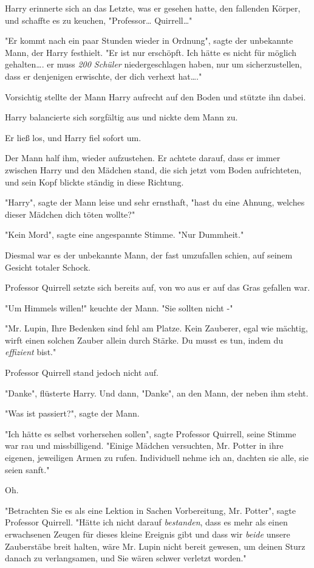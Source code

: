 {Harry erinnerte sich an das Letzte, was er gesehen hatte, den fallenden Körper, und schaffte es zu keuchen, "Professor… Quirrell…"

"Er kommt nach ein paar Stunden wieder in Ordnung", sagte der unbekannte Mann, der Harry festhielt. "Er ist nur erschöpft. Ich hätte es nicht für möglich gehalten…. er muss \emph{200 Schüler} niedergeschlagen haben, nur um sicherzustellen, dass er denjenigen erwischte, der dich verhext hat…."

Vorsichtig stellte der Mann Harry aufrecht auf den Boden und stützte ihn dabei.

Harry balancierte sich sorgfältig aus und nickte dem Mann zu.

Er ließ los, und Harry fiel sofort um.

Der Mann half ihm, wieder aufzustehen. Er achtete darauf, dass er immer zwischen Harry und den Mädchen stand, die sich jetzt vom Boden aufrichteten, und sein Kopf blickte ständig in diese Richtung.

"Harry", sagte der Mann leise und sehr ernsthaft, "hast du eine Ahnung, welches dieser Mädchen dich töten wollte?"

"Kein Mord", sagte eine angespannte Stimme. "Nur Dummheit."

Diesmal war es der unbekannte Mann, der fast umzufallen schien, auf seinem Gesicht totaler Schock.

Professor Quirrell setzte sich bereits auf, von wo aus er auf das Gras gefallen war.

"Um Himmels willen!" keuchte der Mann. "Sie sollten nicht -"

"Mr. Lupin, Ihre Bedenken sind fehl am Platze. Kein Zauberer, egal wie mächtig, wirft einen solchen Zauber allein durch Stärke. Du musst es tun, indem du \emph{effizient} bist."

Professor Quirrell stand jedoch nicht auf.

"Danke", flüsterte Harry. Und dann, "Danke", an den Mann, der neben ihm steht.

"Was ist passiert?", sagte der Mann.

"Ich hätte es selbst vorhersehen sollen", sagte Professor Quirrell, seine Stimme war rau und missbilligend. "Einige Mädchen versuchten, Mr. Potter in ihre eigenen, jeweiligen Armen zu rufen. Individuell nehme ich an, dachten sie alle, sie seien sanft."

Oh.

"Betrachten Sie es als eine Lektion in Sachen Vorbereitung, Mr. Potter", sagte Professor Quirrell. "Hätte ich nicht darauf \emph{bestanden}, dass es mehr als einen erwachsenen Zeugen für dieses kleine Ereignis gibt und dass wir \emph{beide} unsere Zauberstäbe breit halten, wäre Mr. Lupin nicht bereit gewesen, um deinen Sturz danach zu verlangsamen, und Sie wären schwer verletzt worden."

}
